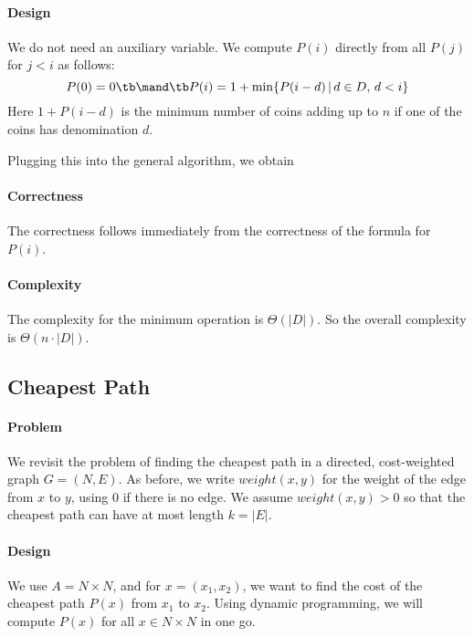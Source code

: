 \paragraph{Design}
We do not need an auxiliary variable.
We compute $P(i)$ directly from all $P(j)$ for $j<i$ as follows:
 \[P(0)=0 \tb\mand\tb P(i)=1+\min \{P(i-d)\,|\,d\in D,\,d<i\}\]
Here $1+P(i-d)$ is the minimum number of coins adding up to $n$ if one of the coins has denomination $d$.

Plugging this into the general algorithm, we obtain

\begin{acode}
\end{acode}

\paragraph{Correctness}
The correctness follows immediately from the correctness of the formula for $P(i)$.

\paragraph{Complexity}
The complexity for the minimum operation is $\Theta(|D|)$.
So the overall complexity is $\Theta(n\cdot |D|)$.

\subsection{Cheapest Path}

\paragraph{Problem}
We revisit the problem of finding the cheapest path in a directed, cost-weighted graph $G=(N,E)$.
As before, we write $weight(x,y)$ for the weight of the edge from $x$ to $y$, using $0$ if there is no edge.
We assume $weight(x,y)>0$ so that the cheapest path can have at most length $k=|E|$.

\paragraph{Design}
We use $A=N\times N$, and for $x=(x_1,x_2)$, we want to find the cost of the cheapest path $P(x)$ from $x_1$ to $x_2$.
Using dynamic programming, we will compute $P(x)$ for all $x\in N\times N$ in one go.

